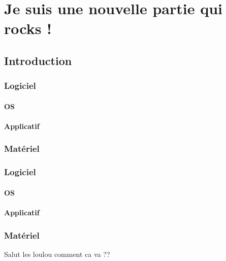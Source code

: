 



\maketitle
\tableofcontents 

\part{Je suis une nouvelle partie qui rocks !}
\chapter{Introduction}
\section{Logiciel}
\subsection{OS}
\subsection{Applicatif}
\section{Matériel}
\section{Logiciel}
\subsection{OS}
\subsection{Applicatif}
\section{Matériel}
Salut les loulou comment ca va ??\\



